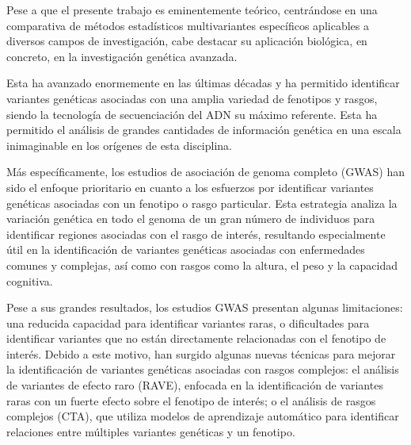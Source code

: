 \documentclass[IB,BIB]{TFUOC}%
\begin{document}
% 
% 

Pese a que el presente trabajo es eminentemente teórico, centrándose en una comparativa de métodos estadísticos multivariantes específicos aplicables a diversos campos de investigación, cabe destacar su aplicación biológica, en concreto, en la investigación genética avanzada.

Esta ha avanzado enormemente en las últimas décadas y ha permitido identificar variantes genéticas asociadas con una amplia variedad de fenotipos y rasgos, siendo la tecnología de secuenciación del ADN su máximo referente. Esta ha permitido el análisis de grandes cantidades de información genética en una escala inimaginable en los orígenes de esta disciplina.

Más específicamente, los estudios de asociación de genoma completo (GWAS) han sido el enfoque prioritario en cuanto a los esfuerzos por identificar variantes genéticas asociadas con un fenotipo o rasgo particular. Esta estrategia analiza la variación genética en todo el genoma de un gran número de individuos para identificar regiones asociadas con el rasgo de interés, resultando especialmente útil en la identificación de variantes genéticas asociadas con enfermedades comunes y complejas, así como con rasgos como la altura, el peso y la capacidad cognitiva.

Pese a sus grandes resultados, los estudios GWAS presentan algunas limitaciones: una reducida capacidad para identificar variantes raras, o dificultades para identificar variantes que no están directamente relacionadas con el fenotipo de interés. Debido a este motivo, han surgido algunas nuevas técnicas para mejorar la identificación de variantes genéticas asociadas con rasgos complejos: el análisis de variantes de efecto raro (RAVE), enfocada en la identificación de variantes raras con un fuerte efecto sobre el fenotipo de interés; o el análisis de rasgos complejos (CTA), que utiliza modelos de aprendizaje automático para identificar relaciones entre múltiples variantes genéticas y un fenotipo.
\end{document}
